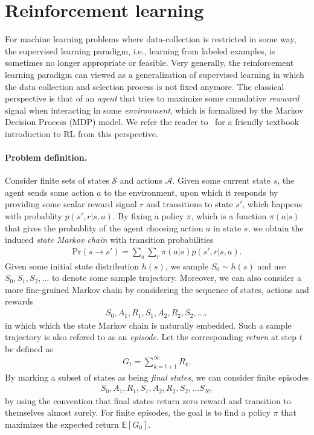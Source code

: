 \documentclass[a4paper]{report}
\theoremstyle{definition}
\theoremstyle{plain}
\begin{document}
\section{Reinforcement learning}

For machine learning problems where data-collection is restricted in some way,
the supervised learning paradigm, i.e., learning from labeled examples, is
sometimes no longer appropriate or feasible.
%
Very generally, the reinforcement learning paradigm can viewed as a
generalization of supervised learning in which the data collection and selection
process is not fixed anymore.
%
The classical perspective is that of an \emph{agent} that tries to maximize some
cumulative \emph{rewward} signal when interacting in some \emph{environment},
which is formalized by the Markov Decision Process (MDP) model.
%
We refer the reader to~\cite{suttonReinforcementLearningIntroduction2018} for a
friendly textbook introduction to RL from this perspective.

\paragraph{Problem definition.}
Consider finite sets of states $\mathcal{S}$ and actions $\mathcal{A}$.
%
Given some current state $s$, the agent sends some action $a$ to the
environment, upon which it responds by providing some scalar reward signal $r$
and transitions to state $s'$, which happens with probablity $p(s', r | s, a)$.
%
By fixing a policy $\pi$, which is a function $\pi(a|s)$ that gives the
probablity of the agent choosing action $a$ in state $s$, we obtain the induced
\emph{state Markov chain} with transition probabilities
%
\begin{align*}
  \mathrm{Pr}(s \rightarrow s') = \sum_{a} \sum_{r} \pi(a|s) p(s', r | s, a) .
\end{align*}
Given some initial state distribution $h(s)$, we sample $S_{0} \sim h(s)$ and
use $S_{0}, S_{1}, S_{2}, \dots$ to denote some sample trajectory.
%
Moreover, we can also consider a more fine-grained Markov chain by considering
the sequence of states, actions and rewards
\begin{align*}
  S_{0}, A_{1}, R_{1}, S_{1}, A_{2}, R_{2}, S_{2}, \dots ,
\end{align*}
in which which the state Markov chain is naturally embedded. Such a sample
trajectory is also refered to as an \emph{episode}.
%
Let the corresponding \emph{return} at step $t$ be
defined as
\begin{align*}
  G_{t} = \sum_{k=t+1}^{\infty} R_{k} .
\end{align*}
By marking a subset of states as being \emph{final states}, we can consider finite episodes
\begin{align*}
  S_{0}, A_{1}, R_{1}, S_{1}, A_{2}, R_{2}, S_{2}, \dots S_{N},
\end{align*}
by using the convention that final states return zero reward and transition to
themselves almost surely.
%
For finite episodes, the goal is to find a policy $\pi$ that maximizes the
expected return $\mathbb{E}[G_{0}]$.
\end{document}
